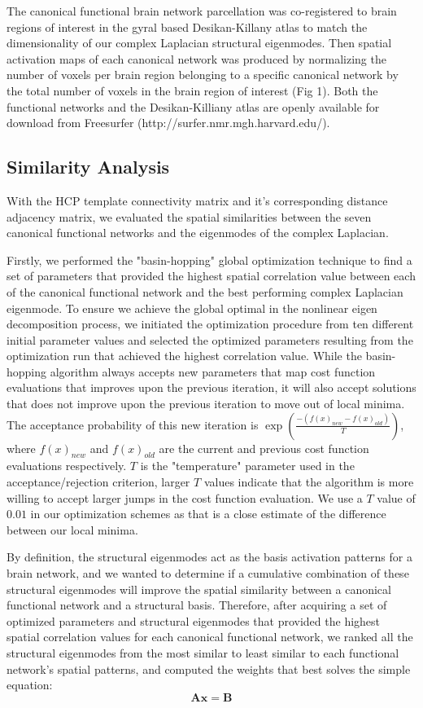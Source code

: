 \documentclass{article}
\begin{document}
The canonical functional brain network parcellation was co-registered to brain regions of interest in the gyral based Desikan-Killany atlas \cite{Desikan2006} to match the dimensionality of our complex Laplacian structural eigenmodes. Then spatial activation maps of each canonical network was produced by normalizing the number of voxels per brain region belonging to a specific canonical network by the total number of voxels in the brain region of interest (Fig 1). Both the functional networks and the Desikan-Killiany atlas are openly available for download from Freesurfer \cite{Fischl2012} (http://surfer.nmr.mgh.harvard.edu/).

\subsection{Similarity Analysis}
With the HCP template connectivity matrix and it's corresponding distance adjacency matrix, we evaluated the spatial similarities between the seven canonical functional networks and the eigenmodes of the complex Laplacian. 

Firstly, we performed the "basin-hopping" global optimization technique \cite{Wales1997} to find a set of parameters that provided the highest spatial correlation value between each of the canonical functional network and the best performing complex Laplacian eigenmode. To ensure we achieve the global optimal in the nonlinear eigen decomposition process, we initiated the optimization procedure from ten different initial parameter values and selected the optimized parameters resulting from the optimization run that achieved the highest correlation value. While the basin-hopping algorithm always accepts new parameters that map cost function evaluations that improves upon the previous iteration, it will also accept solutions that does not improve upon the previous iteration to move out of local minima. The acceptance probability of this new iteration is $\exp(\frac{-(f(x)_{new} - f(x)_{old})}{T})$, where $f(x)_{new}$ and $f(x)_{old}$ are the current and previous cost function evaluations respectively. $T$ is the "temperature" parameter used in the acceptance/rejection criterion, larger $T$ values indicate that the algorithm is more willing to accept larger jumps in the cost function evaluation. We use a $T$ value of $0.01$ in our optimization schemes as that is a close estimate of the difference between our local minima.

By definition, the structural eigenmodes act as the basis activation patterns for a brain network, and we wanted to determine if a cumulative combination of these structural eigenmodes will improve the spatial similarity between a canonical functional network and a structural basis. Therefore, after acquiring a set of optimized parameters and structural eigenmodes that provided the highest spatial correlation values for each canonical functional network, we ranked all the structural eigenmodes from the most similar to least similar to each functional network's spatial patterns, and computed the weights that best solves the simple equation:
\begin{equation}
    \mathbf{Ax = B}
\end{equation}
\end{document}
